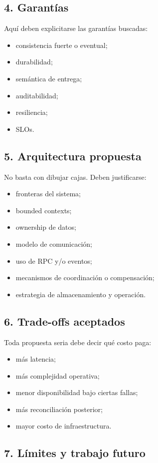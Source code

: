 \documentclass[variant=apuntes,cover=institutional,mode=screen]{ua-engineering-v6-article}
\begin{document}
\subsection{4. Garantías}

Aquí deben explicitarse las garantías buscadas:
\begin{itemize}
\item consistencia fuerte o eventual;
\item durabilidad;
\item semántica de entrega;
\item auditabilidad;
\item resiliencia;
\item SLOs.
\end{itemize}

\subsection{5. Arquitectura propuesta}

No basta con dibujar cajas. Deben justificarse:
\begin{itemize}
\item fronteras del sistema;
\item bounded contexts;
\item ownership de datos;
\item modelo de comunicación;
\item uso de RPC y/o eventos;
\item mecanismos de coordinación o compensación;
\item estrategia de almacenamiento y operación.
\end{itemize}

\subsection{6. Trade-offs aceptados}

Toda propuesta seria debe decir qué costo paga:
\begin{itemize}
\item más latencia;
\item más complejidad operativa;
\item menor disponibilidad bajo ciertas fallas;
\item más reconciliación posterior;
\item mayor costo de infraestructura.
\end{itemize}

\subsection{7. Límites y trabajo futuro}
\end{document}
